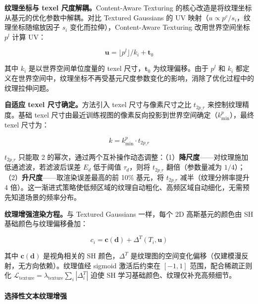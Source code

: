 \textbf{纹理坐标与 texel 尺度解耦。}Content-Aware Texturing 的核心改造是将纹理坐标从基元的优化参数中解耦。对比 Textured Gaussians 的 UV 映射（$u \propto p^c / s_i$，纹理坐标随缩放因子 $s_i$ 变化而拉伸），Content-Aware Texturing 改用世界空间坐标 $p^l$ 计算 UV：

\begin{equation}
    \mathbf{u} = \lfloor p^l \rfloor / k_i + \mathbf{t}_0
\end{equation}

其中 $k_i$ 是以世界空间单位度量的 texel 尺寸，$\mathbf{t}_0$ 为纹理偏移。由于 $p^l$ 和 $k_i$ 都定义在世界空间中，纹理坐标不再受基元尺度参数变化的影响，消除了优化过程中的纹理拉伸问题。

\textbf{自适应 texel 尺寸确定。}方法引入 texel 尺寸与像素尺寸之比 $t_{2p\_r}$ 来控制纹理精度。基础 texel 尺寸由最近训练视图的像素反向投影到世界空间确定（$k^p_{\min}$），最终 texel 尺寸为：

\begin{equation}
    k = k^p_{\min} \cdot t_{2p\_r}
\end{equation}

$t_{2p\_r}$ 只能取 2 的幂次，通过两个互补操作动态调整：（1）\textbf{降尺度}——对纹理施加低通滤波，若滤波后误差 $E_d$ 低于阈值 $\tau_d$，则将 $t_{2p\_r}$ 翻倍（参数量减为 $1/4$）；（2）\textbf{升尺度}——取渲染误差最高的前 10\% 基元，将 $t_{2p\_r}$ 减半（纹理分辨率提升 4 倍）。这一渐进式策略使低频区域的纹理自动粗化、高频区域自动细化，无需预先知道场景的频率分布。

\textbf{纹理增强渲染方程。}与 Textured Gaussians 一样，每个 2D 高斯基元的颜色由 SH 基础颜色与纹理偏移叠加：

\begin{equation}
    c_i = \mathbf{c}(\mathbf{d}) + \Delta^T(T_i, \mathbf{u})
\end{equation}

其中 $\mathbf{c}(\mathbf{d})$ 是视角相关的 SH 颜色，$\Delta^T$ 是纹理图的空间变化偏移（仅建模漫反射，无方向依赖）。纹理值经 sigmoid 激活后约束在 $[-1, 1]$ 范围，配合稀疏正则化 $\mathcal{L}_{\mathrm{texture}} = \lambda_{\mathrm{texture}} \sum_i | \Delta^T_i |$ 迫使 SH 学习基础颜色、纹理仅补充高频细节。

\paragraph{选择性文本纹理增强}


